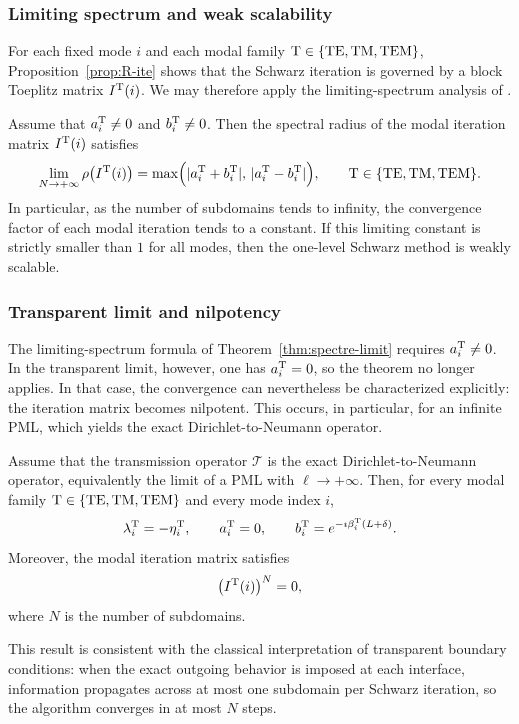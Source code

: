 \documentclass[smallextended]{svjour3}       %
\begin{document}
\subsubsection{Limiting spectrum and weak scalability}

For each fixed mode \(i\) and each modal family \({\rm T}\in\{{\rm TE,TM,TEM}\}\), Proposition~\ref{prop:R-ite} shows that the Schwarz iteration is governed by a block Toeplitz matrix \(I^{\rm T}(i)\). We may therefore apply the limiting-spectrum analysis of \cite{Bootland:2022:APS}.

\begin{theorem}\label{thm:spectre-limit}
Assume that \(a_i^{\rm T}\neq 0\) and \(b_i^{\rm T}\neq 0\). Then the spectral radius of the modal iteration matrix \(I^{\rm T}(i)\) satisfies
\[
\lim_{N\to+\infty}\rho\bigl(I^{\rm T}(i)\bigr)
=
\max\Bigl(
|a_i^{\rm T}+b_i^{\rm T}|,
\,
|a_i^{\rm T}-b_i^{\rm T}|
\Bigr),
\qquad
{\rm T}\in\{{\rm TE,TM,TEM}\}.
\]
In particular, as the number of subdomains tends to infinity, the convergence factor of each modal iteration tends to a constant. If this limiting constant is strictly smaller than \(1\) for all modes, then the one-level Schwarz method is weakly scalable.
\end{theorem}


\subsubsection{Transparent limit and nilpotency}

The limiting-spectrum formula of Theorem~\ref{thm:spectre-limit} requires \(a_i^{\rm T}\neq 0\). In the transparent limit, however, one has \(a_i^{\rm T}=0\), so the theorem no longer applies. In that case, the convergence can nevertheless be characterized explicitly: the iteration matrix becomes nilpotent. This occurs, in particular, for an infinite PML, which yields the exact Dirichlet-to-Neumann operator.

\begin{proposition}\label{prop:nilpotent}
Assume that the transmission operator \(\mathcal T\) is the exact Dirichlet-to-Neumann operator, equivalently the limit of a PML with \(\ell\to+\infty\). Then, for every modal family \({\rm T}\in\{{\rm TE,TM,TEM}\}\) and every mode index \(i\),
\[
\lambda_i^{\rm T}=-\eta_i^{\rm T},
\qquad
a_i^{\rm T}=0,
\qquad
b_i^{\rm T}=e^{-\imath \beta_i^{\rm T}(L+\delta)}.
\]
Moreover, the modal iteration matrix satisfies
\[
\bigl(I^{\rm T}(i)\bigr)^N=0,
\]
where \(N\) is the number of subdomains.
\end{proposition}
This result is consistent with the classical interpretation of transparent boundary conditions: when the exact outgoing behavior is imposed at each interface, information propagates across at most one subdomain per Schwarz iteration, so the algorithm converges in at most \(N\) steps.
\end{document}
